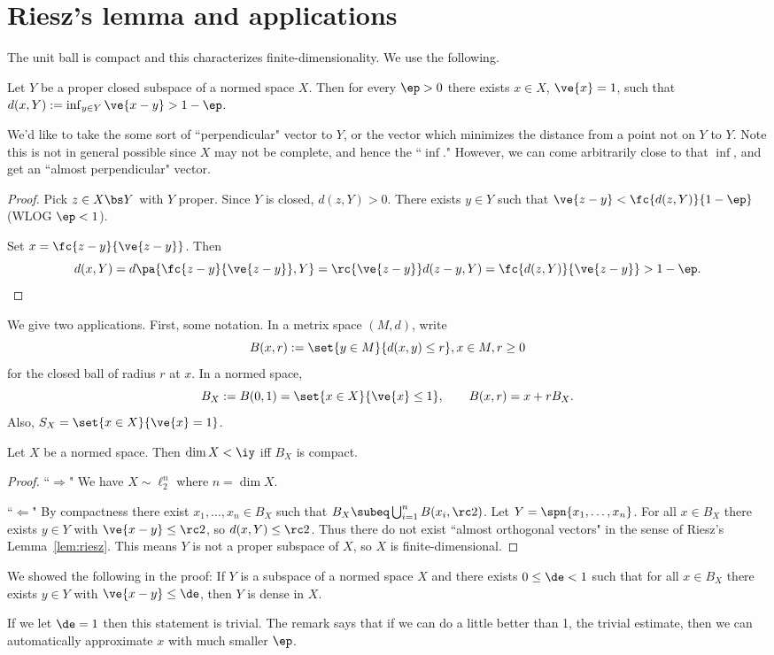 \section{Riesz's lemma and applications}
The unit ball is compact and this characterizes finite-dimensionality. We use the following.
\begin{lem}
Let $Y$ be a proper closed subspace of a normed space $X$. Then for every $\ep>0$ there exists $x\in X$, $\ve{x}=1$, such that $d(x,Y):=\inf_{y\in Y}\ve{x-y}>1-\ep$.
\end{lem}
We'd like to take the some sort of ``perpendicular" vector to $Y$, or the vector which minimizes the distance from a point not on $Y$ to $Y$. Note this is not in general possible since $X$ may not be complete, and hence the ``$\inf$." However, we can come arbitrarily close to that $\inf$, and get an ``almost perpendicular" vector.
\begin{proof}
Pick $z\in X\bs Y$ with $Y$ proper. Since $Y$ is closed, $d(z,Y)>0$. There exists $y\in Y$ such that $\ve{z-y}<\fc{d(z,Y)}{1-\ep}$ (WLOG $\ep<1$).

Set $x=\fc{z-y}{\ve{z-y}}$. Then
\[
d(x,Y)=d\pa{\fc{z-y}{\ve{z-y}},Y}=\rc{\ve{z-y}}d(z-y,Y)=\fc{d(z,Y)}{\ve{z-y}}> 1-\ep.
\]
\end{proof}
We give two applications. First, some notation. In a metrix space $(M,d)$, write 
\[
B(x,r):=\set{y\in M}{d(x,y)\le r},x\in M,r\ge 0
\]
for the closed ball of radius $r$ at $x$. In a normed space, 
\[
B_X:=B(0,1)=\set{x\in X}{\ve{x}\le 1}, \qquad B(x,r)=x+rB_X.
\]
Also, $S_X=\set{x\in X}{\ve{x}=1}$. 
\begin{thm}
Let $X$ be a normed space. Then $\dim X<\iy$ iff $B_X$ is compact.
\end{thm}
\begin{proof}
``$\Rightarrow$" We have $X\sim \ell_2^n$ where $n=\dim X$.

``$\Leftarrow$" By compactness there exist $x_1,\ldots, x_n\in B_X$ such that $B_X\subeq \bigcup_{i=1}^n B(x_i,\rc2)$.  Let $Y=\spn\{x_1,\ldots, x_n\}$. For all $x\in B_X$ there exists $y\in Y$ with $\ve{x-y}\le \rc 2$, so $d(x,Y)\le \rc 2$. Thus there do not exist ``almost orthogonal vectors" in the sense of  Riesz's Lemma~\ref{lem:riesz}. This means $Y$ is not a proper subspace of $X$, so $X$ is finite-dimensional. %
\end{proof}
\begin{rem}
We showed the following in the proof: If $Y$ is a subspace of a normed space $X$ and there exists $0\le \de<1$ such that for all $x\in B_X$ there exists $y\in Y$ with $\ve{x-y}\le \de$, then $Y$ is dense in $X$.
\end{rem}
If we let $\de= 1$ then this statement is trivial. The remark says that if we can do a little better than 1, the trivial estimate, then we can automatically approximate $x$ with much smaller $\ep$.

